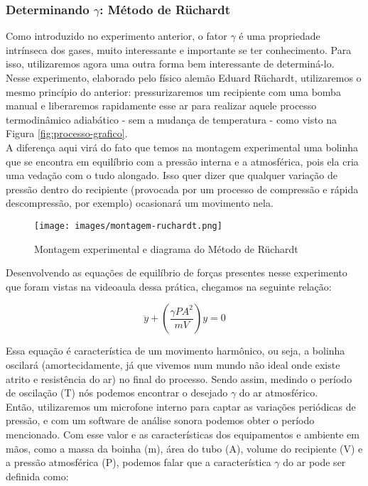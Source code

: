 \subsubsection{Determinando $\gamma$: Método de Rüchardt}

Como introduzido no experimento anterior, o fator $\gamma$ é uma propriedade intrínseca dos gases, muito interessante e importante se ter conhecimento. Para isso, utilizaremos agora uma outra forma bem interessante de determiná-lo.\\

Nesse experimento, elaborado pelo físico alemão Eduard Rüchardt, utilizaremos o mesmo princípio do anterior: pressurizaremos um recipiente com uma bomba manual e liberaremos rapidamente esse ar para realizar aquele processo termodinâmico adiabático - sem a mudança de temperatura - como visto na Figura \ref{fig:processo-grafico}.\\

A diferença aqui virá do fato que temos na montagem experimental uma bolinha que se encontra em equilíbrio com a pressão interna e a atmosférica, pois ela cria uma vedação com o tudo alongado. Isso quer dizer que qualquer variação de pressão dentro do recipiente (provocada por um processo de compressão e rápida descompressão, por exemplo) ocasionará um movimento nela.

\begin{figure}[H]
  \centering
  \texttt{[image: images/montagem-ruchardt.png]}
  \caption{Montagem experimental e diagrama do Método de Rüchardt}
\end{figure}

Desenvolvendo as equações de equilíbrio de forças presentes nesse experimento que foram vistas na videoaula dessa prática, chegamos na seguinte relação:

\[ \ddot{y} + \left( \frac{\gamma P A^2}{m V} \right) y = 0 \]

Essa equação é característica de um movimento harmônico, ou seja, a bolinha oscilará (amortecidamente, já que vivemos num mundo não ideal onde existe atrito e resistência do ar) no final do processo. Sendo assim, medindo o período de oscilação (T) nós podemos encontrar o desejado $\gamma$ do ar atmosférico.\\

Então, utilizaremos um microfone interno para captar as variações periódicas de pressão, e com um software de análise sonora podemos obter o período mencionado. Com esse valor e as características dos equipamentos e ambiente em mãos, como a massa da boinha (m), área do tubo (A), volume do recipiente (V) e a pressão atmosférica (P), podemos falar que a característica $\gamma$ do ar pode ser definida como:

